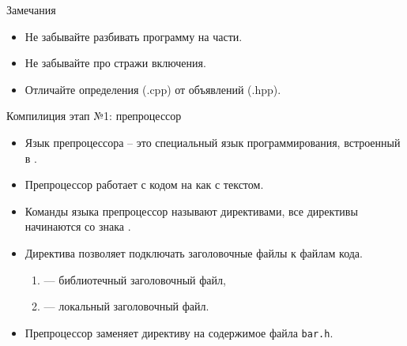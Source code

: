 \documentclass[aspectration=1610,t]{beamer}
\begin{document}
\begin{frame}[fragile]{Замечания}
    \begin{itemize}
        \item Не забывайте разбивать программу на части.
        \item Не забывайте про стражи включения.
        \item Отличайте определения (.cpp) от объявлений (.hpp).
    \end{itemize}
\end{frame}

\begin{frame}[fragile] {Компилиция этап №1: препроцессор}
    \begin{itemize}
        \item Язык препроцессора -- это специальный язык программирования, 
            встроенный в \langcpp.
        \item Препроцессор работает с кодом на \langcpp как с текстом.
        \item Команды языка препроцессор называют директивами,              
            все директивы начинаются со знака \code{\#}.
        \item Директива  позволяет подключать заголовочные файлы к файлам
            кода.
        \begin{enumerate}
            \item {} --- библиотечный заголовочный файл,
            \item {} --- локальный заголовочный файл.
        \end{enumerate}
        \item Препроцессор заменяет директиву  на содержимое
        файла \texttt{bar.h}.
    \end{itemize}

%

\end{frame}
\end{document}
